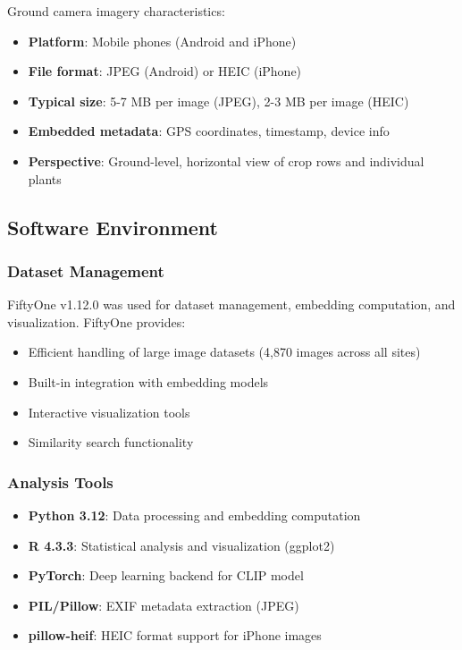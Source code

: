 Ground camera imagery characteristics:
\begin{itemize}
    \item \textbf{Platform}: Mobile phones (Android and iPhone)
    \item \textbf{File format}: JPEG (Android) or HEIC (iPhone)
    \item \textbf{Typical size}: 5-7 MB per image (JPEG), 2-3 MB per image (HEIC)
    \item \textbf{Embedded metadata}: GPS coordinates, timestamp, device info
    \item \textbf{Perspective}: Ground-level, horizontal view of crop rows and individual plants
\end{itemize}


\subsection{Software Environment}

\subsubsection{Dataset Management}
FiftyOne v1.12.0 was used for dataset management, embedding computation, and visualization. FiftyOne provides:
\begin{itemize}
    \item Efficient handling of large image datasets (4,870 images across all sites)
    \item Built-in integration with embedding models
    \item Interactive visualization tools
    \item Similarity search functionality
\end{itemize}

\subsubsection{Analysis Tools}
\begin{itemize}
    \item \textbf{Python 3.12}: Data processing and embedding computation
    \item \textbf{R 4.3.3}: Statistical analysis and visualization (ggplot2)
    \item \textbf{PyTorch}: Deep learning backend for CLIP model
    \item \textbf{PIL/Pillow}: EXIF metadata extraction (JPEG)
    \item \textbf{pillow-heif}: HEIC format support for iPhone images
\end{itemize}


